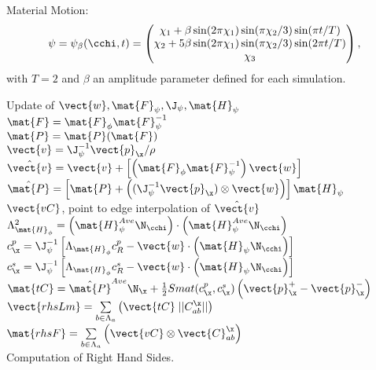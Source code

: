 Material Motion:
\begin{equation}
	\psi = \psi_\beta(\cchi,t) = 
	\begin{pmatrix}
		\chi_1 + \beta \sin(2\pi\chi_1) \sin(\pi\chi_2/3)\sin(\pi t/T) \\
		
		\chi_2 + 5\beta \sin(2\pi\chi_1) \sin(\pi\chi_2/3)\sin(2\pi t/T) \\
		
		\chi_3
	\end{pmatrix},
\end{equation}
with $T=2$ and $\beta$ an amplitude parameter defined for each simulation.


\begin{algorithm}[H]
	Update of $\vect{w}, \mat{F}_{\psi}, \J_{\psi}, \mat{H}_{\psi}$ \\
	$\mat{F} = \mat{F}_{\phi}\mat{F}_{\psi}^{-1}$ \\
	$\mat{P} = \mat{P}(\mat{F})$ \\
	$\vect{v} = \J_{\psi}^{-1} \vect{p}_{\x}/\rho$ \\
	$\hat{\vect{v}} = \vect{v} + \left[ \left( \mat{F}_{\phi}\mat{F}_{\psi}^{-1}\right) \vect{w} \right]$ \\
	$\hat{\mat{P}} = \left[ \mat{P} + \left( (\J_{\psi}^{-1} \vect{p}_{\x})\otimes \vect{w}   \right) \right]\mat{H}_{\psi} $ \\
	$\vect{vC}$, point to edge interpolation of $\hat{\vect{v}}$ \\
	$\Lambda_{\mat{H}_\phi}^2 = \left( \mat{H}_{\psi}^{Ave} \N_{\cchi} \right) \cdot \left( \mat{H}_{\psi}^{Ave} \N_{\cchi} \right)$ \\
	$c^{p}_{\x} = \J_{\psi}^{-1} \left[ \Lambda_{\mat{H}_\phi}c^{p}_{R} - \vect{w}\cdot\left( \mat{H}_{\psi}\N_{\cchi} \right) \right]$ \\
	$c^{s}_{\x} = \J_{\psi}^{-1} \left[ \Lambda_{\mat{H}_\phi}c^{s}_{R} - \vect{w}\cdot\left( \mat{H}_{\psi}\N_{\cchi} \right) \right]$  \\
	$\mat{tC} = \hat{\mat{P}}^{Ave} \N_{\x} + \frac{1}{2} Smat(c^{p}_{\x},c^{s}_{\x}) \left( \vect{p}_{\x}^{+}-\vect{p}_{\x}^{-}\right)$ \\
	$\vect{rhsLm} =  \sum\limits_{b\in\Lambda_a} \left( \vect{tC} \; ||C^{\x}_{ab}|| \right)$ \\
	$\mat{rhsF} =  \sum\limits_{b\in\Lambda_a} \left( \vect{vC} \otimes \vect{C}^{\x}_{ab} \right)$ \\
	\caption{Computation of Right Hand Sides.}
\end{algorithm}

